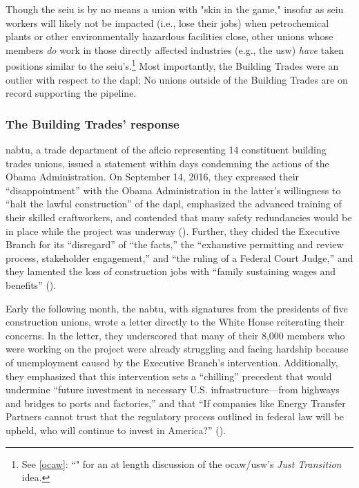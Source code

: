 \documentclass[12pt]{article}
\newcommand{\fullref}[1]{\autoref{#1}: ``\nameref{#1}"}
\begin{document}

Though the \acrshort{seiu} is by no means a union with "skin in the game," insofar as \acrshort{seiu} workers will likely not be impacted (i.e., lose their jobs) when petrochemical plants or other environmentally hazardous facilities close, other unions whose members \emph{do} work in those directly affected industries (e.g., the \acrshort{usw}) \emph{have} taken positions similar to the \acrshort{seiu}'s.\footnote{See \fullref{ocaw} for an at length discussion of the \acrshort{ocaw}/\acrshort{usw}'s \textit{Just Transition} idea.} Most importantly, the Building Trades were an outlier with respect to the \acrshort{dapl}; No unions outside of the Building Trades are on record supporting the pipeline.

\subsubsection{The Building Trades' response}

\acrfull{nabtu}, a trade department of the \acrshort{aflcio} representing 14 constituent building trades unions, issued a statement within days condemning the actions of the Obama Administration. On September 14, 2016, they expressed their “disappointment” with the Obama Administration in the latter’s willingness to “halt the lawful construction” of the \acrshort{dapl}, emphasized the advanced training of their skilled craftworkers, and contended that many safety redundancies would be in place while the project was underway  (\cite{nabtuStatementObamaAdministration2016}). Further, they chided the Executive Branch for its “disregard” of “the facts,” the “exhaustive permitting and review process, stakeholder engagement,” and “the ruling of a Federal Court Judge,” and they lamented the loss of construction jobs with “family sustaining wages and benefits” (\cite{nabtuStatementObamaAdministration2016}).

Early the following month, the \acrshort{nabtu}, with signatures from the presidents of five construction unions, wrote a letter directly to the White House reiterating their concerns. In the letter, they underscored that many of their 8,000 members who were working on the project were already struggling and facing hardship because of unemployment caused by the Executive Branch’s intervention. Additionally, they emphasized that this intervention sets a “chilling” precedent that would undermine “future investment in necessary U.S. infrastructure---from highways and bridges to ports and factories,” and that “If companies like Energy Transfer Partners cannot trust that the regulatory process outlined in federal law will be upheld, who will continue to invest in America?” (\cite{callahanLetterObama2016}).
\end{document}
